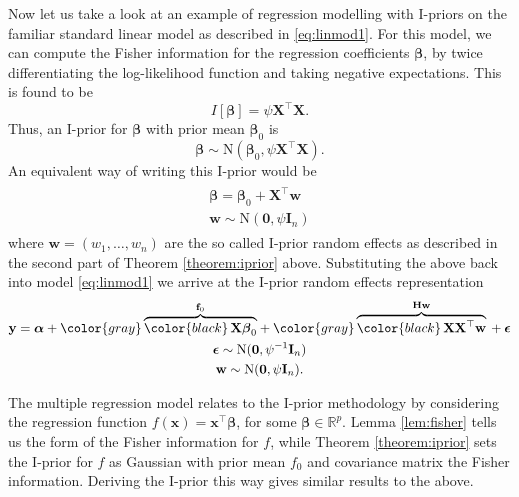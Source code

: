 Now let us take a look at an example of regression modelling with I-priors on the familiar standard linear model as described in \eqref{eq:linmod1}. For this model, we can compute the Fisher information for the regression coefficients $\boldsymbol\beta$, by twice differentiating the log-likelihood function and taking negative expectations. This is found to be 
\[
	I[\boldsymbol\beta] = \psi \mathbf X^\top \mathbf X.
\]
Thus, an I-prior for $\boldsymbol\beta$ with prior mean $\boldsymbol\beta_0$ is
\[
	\boldsymbol\beta \sim \text{N}(\boldsymbol\beta_0, \psi \mathbf X^\top \mathbf X).
\] 
An equivalent way of writing this I-prior would be
\begin{align*}
	\begin{gathered}
		\boldsymbol\beta = \boldsymbol\beta_0 + \mathbf X^\top\mathbf w \\
		\mathbf w \sim \text{N}(\mathbf 0, \psi\mathbf I_n)
	\end{gathered}
\end{align*}
where $\mathbf w = (w_1, \dots, w_n)$ are the so called I-prior random effects as described in the second part of Theorem \ref{theorem:iprior} above. Substituting the above back into model \eqref{eq:linmod1} we arrive at the I-prior random effects representation
\begin{align}\label{eq:linmod3}
	\begin{gathered}
		\mathbf y = \boldsymbol\alpha +
		{\color{gray} \overbrace{{\color{black} \, \mathbf X\boldsymbol\beta_0}}^{\mathbf f_0} }
		+
		{\color{gray} \overbrace{{\color{black} \, \mathbf X\mathbf X^\top \mathbf w}}^{\mathbf H \mathbf w} \, } + \boldsymbol\epsilon \\
		\boldsymbol\epsilon \sim \text{N}(\mathbf 0, \psi^{-1}\mathbf I_n)  \\
		\mathbf w \sim \text{N}(\mathbf 0, \psi\mathbf I_n).
	\end{gathered}
\end{align}

\begin{remark}
	The multiple regression model relates to the I-prior methodology by considering the regression function $f(\mathbf x) = \mathbf x^\top\boldsymbol\beta$, for some $\boldsymbol\beta \in \mathbb R^p$. Lemma \ref{lem:fisher} tells us the form of the Fisher information for $f$, while Theorem \ref{theorem:iprior} sets the I-prior for $f$ as Gaussian with prior mean $f_0$ and covariance matrix the Fisher information. Deriving the I-prior this way gives similar results to the above.
\end{remark}
